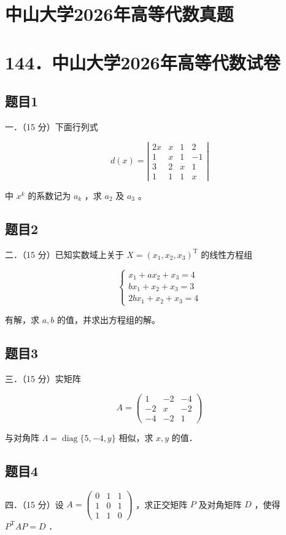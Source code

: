 \documentclass{article}
\begin{document}
\section*{中山大学2026年高等代数真题}
\section*{144．中山大学2026年高等代数试卷}

\subsection{题目1}
一．（15 分）下面行列式

\[
d(x)=\left|\begin{array}{cccc}
2 x & x & 1 & 2 \\
1 & x & 1 & -1 \\
3 & 2 & x & 1 \\
1 & 1 & 1 & x
\end{array}\right|
\]

中 \(x^{k}\) 的系数记为 \(a_{k}\) ，求 \(a_{2}\) 及 \(a_{3}\) 。

\subsection{题目2}
二．（15 分）已知实数域上关于 \(X=\left(x_{1}, x_{2}, x_{3}\right)^{\mathrm{T}}\) 的线性方程组

\[
\left\{\begin{array}{l}
x_{1}+a x_{2}+x_{3}=4 \\
b x_{1}+x_{2}+x_{3}=3 \\
2 b x_{1}+x_{2}+x_{3}=4
\end{array}\right.
\]

有解，求 \(a, b\) 的值，并求出方程组的解。

\subsection{题目3}
三．（15 分）实矩阵

\[
A=\left(\begin{array}{ccc}
1 & -2 & -4 \\
-2 & x & -2 \\
-4 & -2 & 1
\end{array}\right)
\]

与对角阵 \(\Lambda=\operatorname{diag}\{5,-4, y\}\) 相似，求 \(x, y\) 的值．

\subsection{题目4}
四．（15 分）设 \(A=\left(\begin{array}{lll}0 & 1 & 1 \\ 1 & 0 & 1 \\ 1 & 1 & 0\end{array}\right)\) ，求正交矩阵 \(P\) 及对角矩阵 \(D\) ，使得 \(P^{\mathrm{T}} A P=D\) ．
\end{document}
